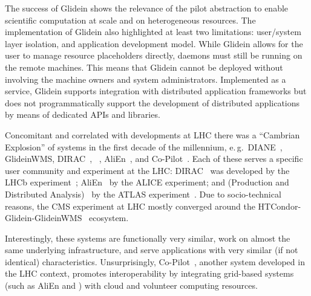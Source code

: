 \documentclass{sig-alternate}
\begin{document}

The success of Glidein shows the relevance of the pilot abstraction to enable
scientific computation at scale and on heterogeneous resources. The
implementation of Glidein also highlighted at least two limitations: user/system
layer isolation, and application development model. While Glidein allows for the
user to manage resource placeholders directly, daemons must still be running on
the remote machines. This means that Glidein cannot be deployed without
involving the machine owners and system administrators. Implemented as a
service, Glidein supports integration with distributed application frameworks
but does not programmatically support the development of distributed
applications by means of dedicated APIs and libraries.

Concomitant and correlated with developments at LHC there was a ``Cambrian
Explosion'' of \pilotjob systems in the first decade of the millennium, e.\,g.\
DIANE~\cite{moscicki2003diane}, GlideinWMS, DIRAC~\cite{casajus2010dirac},
\panda~\cite{zhao2011panda}, AliEn~\cite{saiz2003alien}, and
Co-Pilot~\cite{buncicco2011co}.  Each of these \pilotjobs serves a specific user
community and experiment at the LHC: DIRAC~\cite{casajus2010dirac} was developed
by the LHCb experiment~\cite{lhcb_url}; AliEn~\cite{saiz2003alien}  by the ALICE
experiment; and \panda (Production and Distributed
Analysis)~\cite{zhao2011panda} by the ATLAS experiment~\cite{aad2008atlas}. Due
to socio-technical reasons, the CMS experiment at LHC mostly converged around
the HTCondor-Glidein-GlideinWMS~\cite{sfiligoi2008glideinwms} ecosystem.

Interestingly, these systems are functionally very similar, work on almost the
same underlying infrastructure, and serve applications with very similar (if not
identical) characteristics. Unsurprisingly,
Co-Pilot~\cite{buncicco2011co,harutyunyan2012cernvm}, another \pilotjob system
developed in the LHC context, promotes interoperability by integrating
grid-based \pilotjob systems (such as AliEn and \panda) with cloud and volunteer
computing resources.

\end{document}
